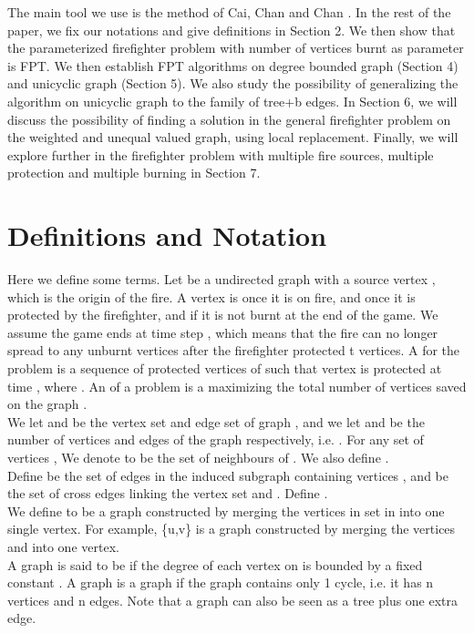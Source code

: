 \documentclass[11pt,letter]{article}
\begin{document}
The main tool we use is the  method of Cai, Chan and Chan \cite{CCC06}.  In the rest of the paper, we fix our notations and give definitions in Section 2. We then show that the parameterized firefighter problem with number of vertices burnt as parameter is FPT. We then establish FPT algorithms on degree bounded graph (Section 4) and unicyclic graph (Section 5). We also study the possibility of generalizing the algorithm on unicyclic graph to the family of tree+b edges. In Section 6, we will discuss the possibility of finding a solution in the general firefighter problem on the weighted and unequal valued graph, using local replacement. Finally, we will explore further in the firefighter problem with multiple fire sources, multiple protection and multiple burning in Section 7.



\section{Definitions and Notation}
Here we define some terms. Let  be a undirected graph with a source vertex , which is the origin of the fire. A vertex is  once it is on fire, and  once it is protected by the firefighter, and  if it is not burnt at the end of the game. We assume the game ends at time step , which means that the fire can no longer spread to any unburnt vertices after the firefighter protected t vertices. A  for the  problem is a sequence  of protected vertices of  such that vertex  is protected at time , where . An  of a  problem is a  maximizing the total number of vertices saved on the graph .\\

We let  and  be the vertex set and edge set of graph , and we let  and  be the number of vertices and edges of the graph  respectively, i.e. . For any set of vertices , We denote  to be the set of neighbours of . We also define .\\

Define  be the set of edges in the induced subgraph containing vertices , and  be the set of cross edges linking the vertex set  and . Define .\\

We define  to be a graph  constructed by merging the vertices in set  in  into one single vertex. For example, \{u,v\} is a graph constructed by merging the vertices  and  into one vertex.\\

A graph  is said to be  if the degree of each vertex on  is bounded by a fixed constant . 
A graph  is a  graph if the graph contains only 1 cycle, i.e. it has n vertices and n edges. Note that a  graph can also be seen as a tree plus one extra edge.\\
\end{document}
